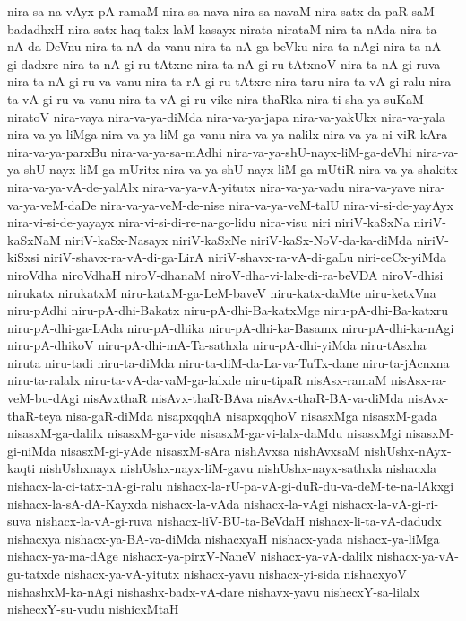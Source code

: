 {nira-sa-na-vAyx-pA-ramaM
nira-sa-nava
nira-sa-navaM
nira-satx-da-paR-saM-badadhxH
nira-satx-haq-takx-laM-kasayx
nirata
nirataM
nira-ta-nAda
nira-ta-nA-da-DeVnu
nira-ta-nA-da-vanu
nira-ta-nA-ga-beVku
nira-ta-nAgi
nira-ta-nA-gi-dadxre
nira-ta-nA-gi-ru-tAtxne
nira-ta-nA-gi-ru-tAtxnoV
nira-ta-nA-gi-ruva
nira-ta-nA-gi-ru-va-vanu
nira-ta-rA-gi-ru-tAtxre
nira-taru
nira-ta-vA-gi-ralu
nira-ta-vA-gi-ru-va-vanu
nira-ta-vA-gi-ru-vike
nira-thaRka
nira-ti-sha-ya-suKaM
niratoV
nira-vaya
nira-va-ya-diMda
nira-va-ya-japa
nira-va-yakUkx
nira-va-yala
nira-va-ya-liMga
nira-va-ya-liM-ga-vanu
nira-va-ya-nalilx
nira-va-ya-ni-viR-kAra
nira-va-ya-parxBu
nira-va-ya-sa-mAdhi
nira-va-ya-shU-nayx-liM-ga-deVhi
nira-va-ya-shU-nayx-liM-ga-mUritx
nira-va-ya-shU-nayx-liM-ga-mUtiR
nira-va-ya-shakitx
nira-va-ya-vA-de-yalAlx
nira-va-ya-vA-yitutx
nira-va-ya-vadu
nira-va-yave
nira-va-ya-veM-daDe
nira-va-ya-veM-de-nise
nira-va-ya-veM-talU
nira-vi-si-de-yayAyx
nira-vi-si-de-yayayx
nira-vi-si-di-re-na-go-lidu
nira-visu
niri
niriV-kaSxNa
niriV-kaSxNaM
niriV-kaSx-Nasayx
niriV-kaSxNe
niriV-kaSx-NoV-da-ka-diMda
niriV-kiSxsi
niriV-shavx-ra-vA-di-ga-LirA
niriV-shavx-ra-vA-di-gaLu
niri-ceCx-yiMda
niroVdha
niroVdhaH
niroV-dhanaM
niroV-dha-vi-lalx-di-ra-beVDA
niroV-dhisi
nirukatx
nirukatxM
niru-katxM-ga-LeM-baveV
niru-katx-daMte
niru-ketxVna
niru-pAdhi
niru-pA-dhi-Bakatx
niru-pA-dhi-Ba-katxMge
niru-pA-dhi-Ba-katxru
niru-pA-dhi-ga-LAda
niru-pA-dhika
niru-pA-dhi-ka-Basamx
niru-pA-dhi-ka-nAgi
niru-pA-dhikoV
niru-pA-dhi-mA-Ta-sathxla
niru-pA-dhi-yiMda
niru-tAsxha
niruta
niru-tadi
niru-ta-diMda
niru-ta-diM-da-La-va-TuTx-dane
niru-ta-jAcnxna
niru-ta-ralalx
niru-ta-vA-da-vaM-ga-lalxde
niru-tipaR
nisAsx-ramaM
nisAsx-ra-veM-bu-dAgi
nisAvxthaR
nisAvx-thaR-BAva
nisAvx-thaR-BA-va-diMda
nisAvx-thaR-teya
nisa-gaR-diMda
nisapxqqhA
nisapxqqhoV
nisasxMga
nisasxM-gada
nisasxM-ga-dalilx
nisasxM-ga-vide
nisasxM-ga-vi-lalx-daMdu
nisasxMgi
nisasxM-gi-niMda
nisasxM-gi-yAde
nisasxM-sAra
nishAvxsa
nishAvxsaM
nishUshx-nAyx-kaqti
nishUshxnayx
nishUshx-nayx-liM-gavu
nishUshx-nayx-sathxla
nishacxla
nishacx-la-ci-tatx-nA-gi-ralu
nishacx-la-rU-pa-vA-gi-duR-du-va-deM-te-na-lAkxgi
nishacx-la-sA-dA-Kayxda
nishacx-la-vAda
nishacx-la-vAgi
nishacx-la-vA-gi-ri-suva
nishacx-la-vA-gi-ruva
nishacx-liV-BU-ta-BeVdaH
nishacx-li-ta-vA-dadudx
nishacxya
nishacx-ya-BA-va-diMda
nishacxyaH
nishacx-yada
nishacx-ya-liMga
nishacx-ya-ma-dAge
nishacx-ya-pirxV-NaneV
nishacx-ya-vA-dalilx
nishacx-ya-vA-gu-tatxde
nishacx-ya-vA-yitutx
nishacx-yavu
nishacx-yi-sida
nishacxyoV
nishashxM-ka-nAgi
nishashx-badx-vA-dare
nishavx-yavu
nishecxY-sa-lilalx
nishecxY-su-vudu
nishicxMtaH
}
